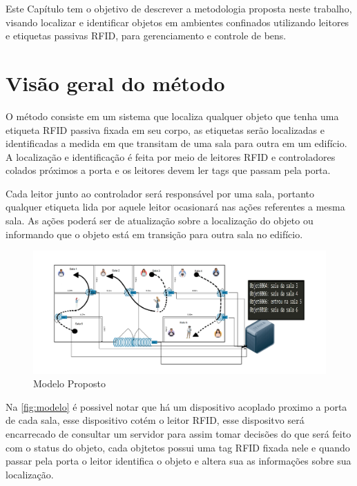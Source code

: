 
\label{chapter:metodo}
Este Capítulo tem o objetivo de descrever a metodologia proposta neste trabalho, visando localizar e identificar objetos em ambientes confinados utilizando leitores e etiquetas passivas RFID, para gerenciamento e controle de bens.

\section{Visão geral do método}
O método consiste em um sistema que localiza qualquer objeto que tenha uma etiqueta RFID passiva fixada em seu corpo, as etiquetas serão localizadas e identificadas a medida em que transitam de uma sala para outra em um edifício. A localização e identificação é feita por meio de leitores RFID e controladores colados próximos a porta e os leitores devem ler tags que passam pela porta.
\par
Cada leitor junto ao controlador será responsável por uma sala, portanto qualquer etiqueta lida por aquele leitor ocasionará nas ações referentes a mesma sala. As ações poderá ser de atualização sobre a localização do objeto ou informando que o objeto está em transição para outra sala no edifício.
\begin{figure}[H]
              \caption{\label{fig:modelo}{Modelo Proposto}}
              \centering
              \includegraphics[width=1.1\textwidth]{Figuras/bigpicture.png}
        \end{figure}
\par
Na \autoref{fig:modelo} é possivel notar que há um dispositivo acoplado proximo a porta de cada sala, esse dispositivo cotém o leitor RFID, esse dispositvo será encarrecado de consultar um servidor para assim tomar decisões do que será feito com o status do objeto, cada objtetos possui uma tag RFID fixada nele e quando passar pela porta o leitor identifica o objeto e altera sua as informações sobre sua localização.


